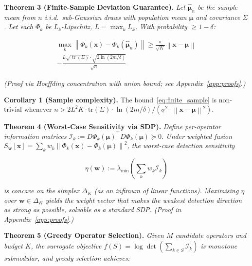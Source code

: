 \documentclass[journal]{IEEEtran}
\newcommand{\norm}[1]{\left\lVert#1\right\rVert}
\DeclareMathOperator{\tr}{tr}
\begin{document}
\vspace{0.5em}

\textbf{Theorem 3 (Finite-Sample Deviation Guarantee).} \textit{Let $\hat{\boldsymbol{\mu}}_n$ be the sample mean from $n$ i.i.d.\ sub-Gaussian draws with population mean $\boldsymbol{\mu}$ and covariance $\Sigma$. Let each $\Phi_k$ be $L_k$-Lipschitz, $L = \max_k L_k$. With probability $\geq 1 - \delta$:}

\begin{multline}
\max_{k} \norm{\Phi_k(\mathbf{x}) - \Phi_k(\hat{\boldsymbol{\mu}}_n)} \geq
  \frac{\underline{\sigma}}{\sqrt{K}} \norm{\mathbf{x} - \boldsymbol{\mu}} \\
  - \frac{L \sqrt{\tr(\Sigma)} \cdot \sqrt{2 \ln(2m/\delta)}}{\sqrt{n}}
\label{eq:finite_sample}
\end{multline}

\textit{(Proof via Hoeffding concentration with union bound; see Appendix~\ref{app:proofs}.)}

\textbf{Corollary 1 (Sample complexity).} The bound~\eqref{eq:finite_sample} is non-trivial whenever $n > 2 L^2 K \cdot \text{tr}(\Sigma) \cdot \ln(2m/\delta) / (\underline{\sigma}^2 \cdot \norm{\mathbf{x} - \boldsymbol{\mu}}^2)$.



\textbf{Theorem 4 (Worst-Case Sensitivity via SDP).} \textit{Define per-operator information matrices $\mathcal{I}_k := D\Phi_k(\boldsymbol{\mu})^\top D\Phi_k(\boldsymbol{\mu}) \succeq 0$. Under weighted fusion $S_{\mathbf{w}}[\mathbf{x}] = \sum_k w_k \norm{\Phi_k(\mathbf{x}) - \Phi_k(\boldsymbol{\mu})}^2$, the worst-case detection sensitivity}

\begin{equation}
\eta(\mathbf{w}) := \lambda_{\min}\!\left(\textstyle\sum_k w_k \mathcal{I}_k\right)
\label{eq:sensitivity}
\end{equation}

\textit{is concave on the simplex $\Delta_K$ (as an infimum of linear functions). Maximising $\eta$ over $\mathbf{w} \in \Delta_K$ yields the weight vector that makes the weakest detection direction as strong as possible, solvable as a standard SDP. (Proof in Appendix~\ref{app:proofs}.)}

\vspace{0.5em}

\textbf{Theorem 5 (Greedy Operator Selection).} \textit{Given $M$ candidate operators and budget $K$, the surrogate objective $f(S) = \log\det(\sum_{k \in S} \mathcal{I}_k)$ is monotone submodular, and greedy selection achieves:}
\end{document}
